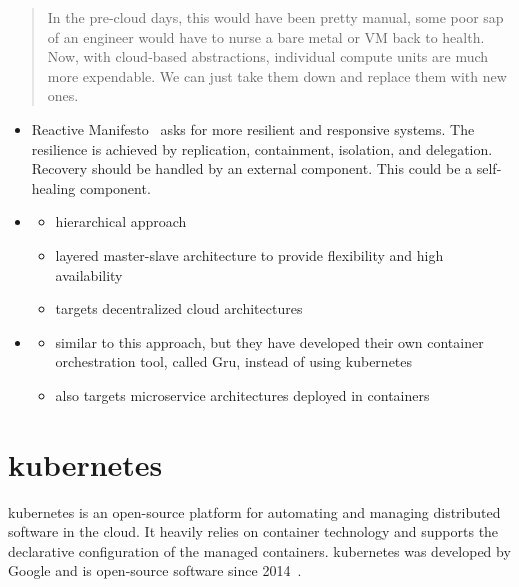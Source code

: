   \begin{quote}
    In the pre-cloud days, this would have been pretty manual, some poor sap of an engineer would have to nurse a bare metal or VM back to health.
    Now, with cloud-based abstractions, individual compute units are much more expendable.
    We can just take them down and replace them with new ones.
  \end{quote}

  \begin{itemize}
    \item Reactive Manifesto~\cite{reactivemanifesto} asks for more resilient and responsive systems.
    The resilience is achieved by replication, containment, isolation, and delegation.
    Recovery should be handled by an external component.
    This could be a self-healing component.
    \item \cite{StackCloud}
      \begin{itemize}
        \item hierarchical approach
        \item layered master-slave architecture to provide flexibility and high availability
        \item targets decentralized cloud architectures
      \end{itemize}
    \item \cite{gru}
      \begin{itemize}
      \item similar to this approach, but they have developed their own container orchestration tool, called Gru, instead of using \gls{kubernetes}
      \item also targets microservice architectures deployed in containers
    \end{itemize}
  \end{itemize}

\section[Kubernetes]{\gls{kubernetes}}\label{sec:kubernetes}
  \Gls{kubernetes} is an open-source platform for automating and managing distributed software in the cloud.
  It heavily relies on container technology and supports the declarative configuration of the managed containers.
  \Gls{kubernetes} was developed by Google and is open-source software since 2014~\cite{kubernetes}.

